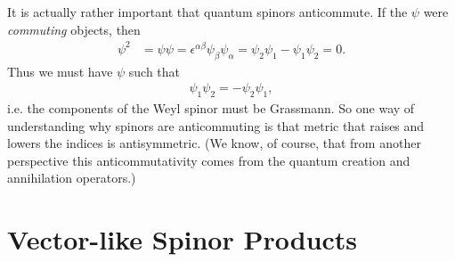 
% 
% 

It is actually rather important that quantum spinors anticommute. If the $\psi$ were \emph{commuting} objects, then
\begin{align}
    \psi^2 &= \psi\psi = \epsilon^{\alpha\beta}\psi_\beta\psi_\alpha = \psi_2\psi_1-\psi_1\psi_2 =0.
\end{align}
Thus we must have $\psi$ such that
\begin{align}
    \psi_1\psi_2 = -\psi_2\psi_1,
\end{align}
i.e. the components of the Weyl spinor must be Grassmann. 
So one way of understanding why spinors are anticommuting is that metric that raises and lowers the indices is antisymmetric. (We know, of course, that from another perspective this anticommutativity comes from the quantum creation and annihilation operators.)


\section{Vector-like Spinor Products}


